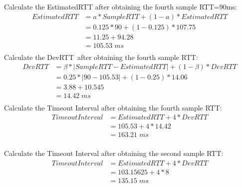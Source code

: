 \documentclass[12pt,a4paper]{article}
\begin{document}
Calculate the EstimatedRTT after obtaining the fourth sample RTT=90ms:
\begin{equation*}
    \begin{split}
        EstimatedRTT &= a * SampleRTT+(1- a) * EstimatedRTT \\
                     &= 0.125 * 90 + (1-0.125) * 107.75 \\
                     &= 11.25 + 94.28\\
                     &= 105.53 \; ms \\
    \end{split}
\end{equation*}
Calculate the DevRTT after obtaining the fourth sample RTT:
\begin{equation*}
    \begin{split}
        DevRTT &= \beta * | SampleRTT- EstimatedRTT|+(1- \beta )* DevRTT \\
                     &= 0.25 * |90-105.53| + (1-0.25) *14.06 \\
                     &= 3.88 + 10.545 \\
                     &= 14.42 \; ms \\
    \end{split}
\end{equation*}
Calculate the Timeout Interval after obtaining the fourth sample RTT:
\begin{equation*}
    \begin{split}
        TimeoutInterval &= EstimatedRTT +4* DevRTT \\
                     &= 105.53 + 4 *14.42\\
                     &= 163.21 \; ms\\
    \end{split}
\end{equation*}

Calculate the Timeout Interval after obtaining the second sample RTT:
\begin{equation*}
    \begin{split}
        TimeoutInterval &= EstimatedRTT +4* DevRTT \\
                     &= 103.15625 + 4 *8\\
                     &= 135.15 \; ms\\
    \end{split}
\end{equation*}
\end{document}
